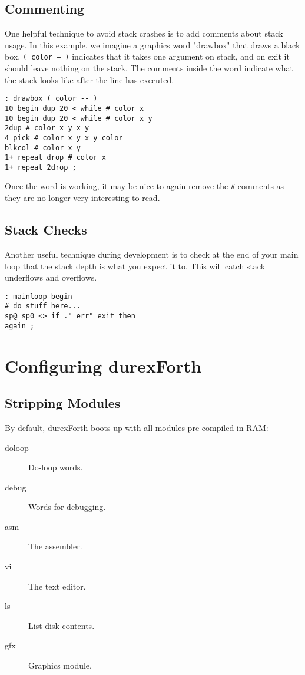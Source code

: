 \subsection{Commenting}

One helpful technique to avoid stack crashes is to add comments about stack usage.
In this example, we imagine a graphics word "drawbox" that draws a black box.
\texttt{( color -- )} indicates that it takes one argument on stack, and on exit it should
leave nothing on the stack. The comments inside the word indicate what the stack
looks like after the line has executed.

\begin{verbatim}
: drawbox ( color -- )
10 begin dup 20 < while # color x
10 begin dup 20 < while # color x y
2dup # color x y x y
4 pick # color x y x y color
blkcol # color x y
1+ repeat drop # color x
1+ repeat 2drop ;
\end{verbatim}

Once the word is working, it may be nice to again remove the \texttt{\#} comments as
they are no longer very interesting to read.

\subsection{Stack Checks}

Another useful technique during development is to check at the end of your main loop
that the stack depth is what you expect it to. This will catch stack underflows
and overflows.

\begin{verbatim}
: mainloop begin
# do stuff here...
sp@ sp0 <> if ." err" exit then
again ;
\end{verbatim}

\section{Configuring durexForth}

\subsection{Stripping Modules}

By default, durexForth boots up with all modules pre-compiled in RAM:

\begin{description}
\item[doloop] Do-loop words.
\item[debug] Words for debugging.
\item[asm] The assembler.
\item[vi] The text editor.
\item[ls] List disk contents.
\item[gfx] Graphics module.
\end{description}


